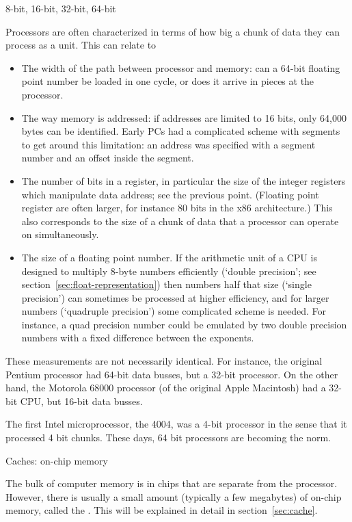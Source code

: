  {8-bit, 16-bit, 32-bit, 64-bit}

Processors are often characterized in terms of how big a chunk of data
they can process as a unit. This can relate to
\begin{itemize}
\item The width of the path between processor and memory: can a 64-bit
  floating point number be loaded in one cycle, or does it arrive in
  pieces at the processor.
\item The way memory is addressed: if addresses are limited to 16
  bits, only 64,000 bytes can be identified. Early PCs had a
  complicated scheme with segments to get around this limitation: an
  address was specified with a segment number and an offset inside the segment.
\item The number of bits in a register, in particular the size of the
  integer registers which manipulate data address; see the previous
  point. (Floating point register are often larger, for instance 80
  bits in the x86 architecture.) This also corresponds to the size of
  a chunk of data that a processor can operate on simultaneously.
\item The size of a floating point number. If the arithmetic unit of a
  \ac{CPU} is designed to multiply 8-byte numbers efficiently (`double
  precision'; see section~\ref{sec:float-representation}) then numbers half
  that size (`single precision') can sometimes be processed at higher
  efficiency, and for larger numbers (`quadruple precision') some
  complicated scheme is needed. For instance, a quad precision number
  could be emulated by two double precision numbers with a fixed
  difference between the exponents.
\end{itemize}
These measurements are not necessarily identical. For instance, the
original Pentium processor had 64-bit data busses, but a 32-bit
processor. On the other hand, the Motorola 68000 processor (of the
original Apple Macintosh) had a 32-bit \ac{CPU}, but 16-bit data busses.

The first Intel microprocessor, the 4004, was a 4-bit
processor in the sense that it processed 4 bit chunks. These days,
64 bit processors are becoming the norm.

 {Caches: on-chip memory}

The bulk of computer memory is in chips that are separate from the processor.
However, there is usually a small amount (typically a few megabytes)
of on-chip memory, called the . This will be 
explained in detail in section~\ref{sec:cache}.

